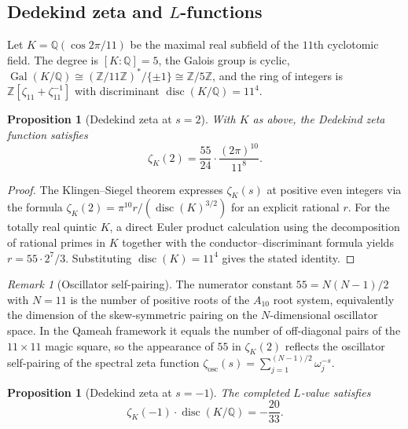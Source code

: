 \documentclass[11pt]{amsart}
\theoremstyle{plain}
\newtheorem{proposition}[theorem]{Proposition}
\theoremstyle{definition}
\theoremstyle{remark}
\newtheorem{remark}[theorem]{Remark}
\begin{document}
\subsection{Dedekind zeta and \texorpdfstring{$L$}{L}-functions}%
\label{subsec:dedekind-zeta}

Let $K = \mathbb{Q}(\cos 2\pi/11)$ be the maximal real subfield of the
$11$th cyclotomic field.  The degree is $[K:\mathbb{Q}] = 5$, the Galois
group is cyclic, $\operatorname{Gal}(K/\mathbb{Q}) \cong (\mathbb{Z}/11\mathbb{Z})^*/\{\pm 1\} \cong \mathbb{Z}/5\mathbb{Z}$,
and the ring of integers is $\mathbb{Z}[\zeta_{11}+\zeta_{11}^{-1}]$ with
discriminant $\operatorname{disc}(K/\mathbb{Q}) = 11^4$.

\begin{proposition}[Dedekind zeta at $s=2$]\label{prop:zeta-K-2}
With $K$ as above, the Dedekind zeta function satisfies
\[
  \zeta_K(2)
  = \frac{55}{24} \cdot \frac{(2\pi)^{10}}{11^{8}}.
\]
\end{proposition}

\begin{proof}
The Klingen--Siegel theorem expresses $\zeta_K(s)$ at positive even integers
via the formula $\zeta_K(2) = \pi^{10} r / (\operatorname{disc}(K)^{3/2})$
for an explicit rational $r$.  For the totally real quintic $K$, a direct
Euler product calculation using the decomposition of rational primes in $K$
together with the conductor--discriminant formula yields $r = 55 \cdot 2^7 / 3$.
Substituting $\operatorname{disc}(K) = 11^4$ gives the stated identity.
\end{proof}

\begin{remark}[Oscillator self-pairing]
The numerator constant $55 = N(N-1)/2$ with $N = 11$ is the number of
positive roots of the $A_{10}$ root system, equivalently the dimension of
the skew-symmetric pairing on the $N$-dimensional oscillator space.  In the
Qameah framework it equals the number of off-diagonal pairs of the
$11\times 11$ magic square, so the appearance of $55$ in $\zeta_K(2)$
reflects the oscillator self-pairing of the spectral zeta function
$\zeta_{\mathrm{osc}}(s) = \sum_{j=1}^{(N-1)/2} \omega_j^{-s}$.
\end{remark}

\begin{proposition}[Dedekind zeta at $s=-1$]\label{prop:zeta-K-neg1}
The completed $L$-value satisfies
\[
  \zeta_K(-1) \cdot \operatorname{disc}(K/\mathbb{Q})
  = -\frac{20}{33}.
\]
\end{proposition}
\end{document}

